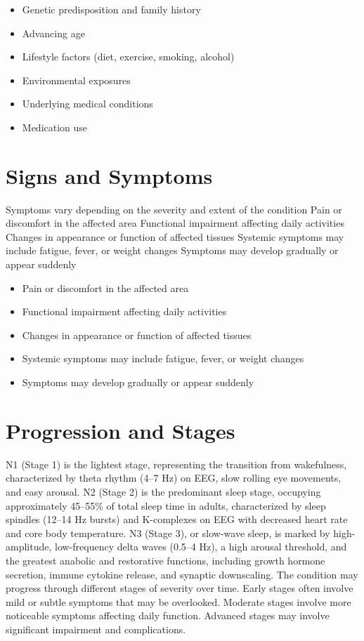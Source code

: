\begin{itemize}[noitemsep]
  \item Genetic predisposition and family history
  \item Advancing age
  \item Lifestyle factors (diet, exercise, smoking, alcohol)
  \item Environmental exposures
  \item Underlying medical conditions
  \item Medication use
\end{itemize}
\section{Signs and Symptoms}
Symptoms vary depending on the severity and extent of the condition Pain or discomfort in the affected area Functional impairment affecting daily activities Changes in appearance or function of affected tissues Systemic symptoms may include fatigue, fever, or weight changes Symptoms may develop gradually or appear suddenly

\begin{itemize}[noitemsep]
  \item Pain or discomfort in the affected area
  \item Functional impairment affecting daily activities
  \item Changes in appearance or function of affected tissues
  \item Systemic symptoms may include fatigue, fever, or weight changes
  \item Symptoms may develop gradually or appear suddenly
\end{itemize}
\section{Progression and Stages}
N1 (Stage 1) is the lightest stage, representing the transition from wakefulness, characterized by theta rhythm (4--7 Hz) on EEG, slow rolling eye movements, and easy arousal. N2 (Stage 2) is the predominant sleep stage, occupying approximately 45--55\% of total sleep time in adults, characterized by sleep spindles (12--14 Hz bursts) and K-complexes on EEG with decreased heart rate and core body temperature. N3 (Stage 3), or slow-wave sleep, is marked by high-amplitude, low-frequency delta waves (0.5--4 Hz), a high arousal threshold, and the greatest anabolic and restorative functions, including growth hormone secretion, immune cytokine release, and synaptic downscaling. The condition may progress through different stages of severity over time. Early stages often involve mild or subtle symptoms that may be overlooked. Moderate stages involve more noticeable symptoms affecting daily function. Advanced stages may involve significant impairment and complications.
